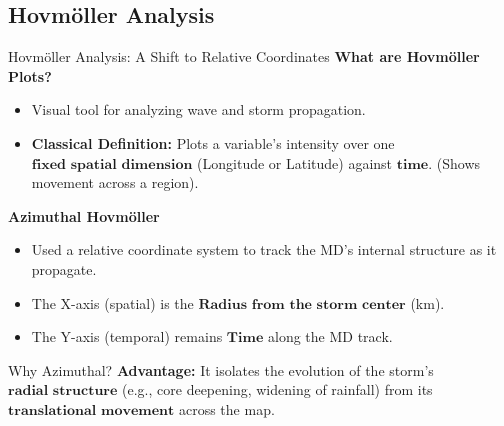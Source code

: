 \documentclass[aspectratio=169,t,xcolor=table]{beamer}
\begin{document}
\subsection{Hovm\"oller Analysis}
\begin{frame}{Hovm\"oller Analysis: A Shift to Relative Coordinates}
	\vspace{-0.2cm}
	\textbf{\small What are Hovm\"oller Plots?}
	\footnotesize
	\begin{itemize}
		\item Visual tool for analyzing wave and storm propagation.
		\item \textbf{Classical Definition:} Plots a variable's intensity over one $\textbf{fixed spatial dimension}$ (Longitude or Latitude) against $\textbf{time}$. (Shows movement across a region).
	\end{itemize}

	\vspace{0.5cm}

	\textbf{\small Azimuthal Hovmöller}
	\footnotesize
	\begin{itemize}
		\item Used a relative coordinate system to track the MD's internal structure as it propagate.
		\item The X-axis (spatial) is the $\textbf{Radius from the storm center}$ (km).
		\item The Y-axis (temporal) remains $\textbf{Time}$ along the MD track.
	\end{itemize}

	\vspace{-1cm}
	\begin{alertblock}{\small Why Azimuthal?}
		\footnotesize
		\textbf{Advantage:} It isolates the evolution of the storm's $\textbf{radial structure}$ (e.g., core deepening, widening of rainfall) from its $\textbf{translational movement}$ across the map.
	\end{alertblock}
\end{frame}
\end{document}
